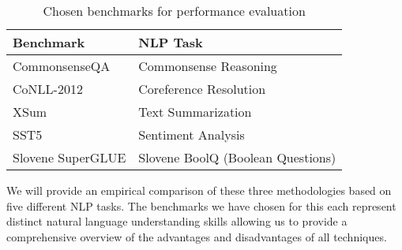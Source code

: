 \begin{table}[htbp]
  \centering
  \begin{tabularx}{\columnwidth}{lX}
    \toprule
    \textbf{Benchmark} & \textbf{NLP Task} \\
    \midrule
    CommonsenseQA \cite{talmor2019commonsenseqa} & Commonsense Reasoning \\
    CoNLL-2012 \cite{pradhan2012conll} & Coreference Resolution \\
    XSum \cite{narayan2018xsum} & Text Summarization \\
    SST5 \cite{maas2011sentiment} & Sentiment Analysis \\
    Slovene SuperGLUE \cite{robnik2022superglue} & Slovene BoolQ (Boolean Questions) \\
    \bottomrule
  \end{tabularx}
  \caption{Chosen benchmarks for performance evaluation}
  \label{tab:benchmarks}
\end{table}
We will provide an empirical comparison of these three methodologies based on five different NLP tasks. The benchmarks we have chosen for this each represent distinct natural language understanding skills allowing us to provide a comprehensive overview of the advantages and disadvantages of all techniques.